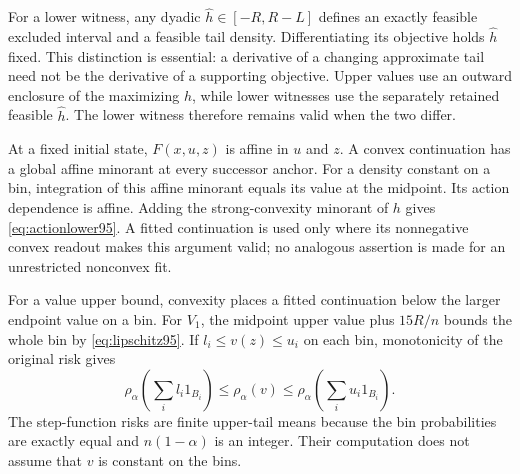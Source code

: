 For a lower witness, any dyadic $\widehat h\in[-R,R-L]$ defines an exactly feasible excluded interval and a feasible tail density. Differentiating its objective holds $\widehat h$ fixed. This distinction is essential: a derivative of a changing approximate tail need not be the derivative of a supporting objective. Upper values use an outward enclosure of the maximizing $h$, while lower witnesses use the separately retained feasible $\widehat h$. The lower witness therefore remains valid when the two differ.

At a fixed initial state, $F(x,u,z)$ is affine in $u$ and $z$. A convex continuation has a global affine minorant at every successor anchor. For a density constant on a bin, integration of this affine minorant equals its value at the midpoint. Its action dependence is affine. Adding the strong-convexity minorant of $h$ gives \eqref{eq:actionlower95}. A fitted continuation is used only where its nonnegative convex readout makes this argument valid; no analogous assertion is made for an unrestricted nonconvex fit.

For a value upper bound, convexity places a fitted continuation below the larger endpoint value on a bin. For $V_1$, the midpoint upper value plus $15R/n$ bounds the whole bin by \eqref{eq:lipschitz95}. If $l_i\leq v(z)\leq u_i$ on each bin, monotonicity of the original risk gives
\[
 \rho_\alpha\!\left(\sum_i l_i1_{B_i}\right)
 \leq\rho_\alpha(v)\leq
 \rho_\alpha\!\left(\sum_i u_i1_{B_i}\right).
\]
The step-function risks are finite upper-tail means because the bin probabilities are exactly equal and $n(1-\alpha)$ is an integer. Their computation does not assume that $v$ is constant on the bins.

